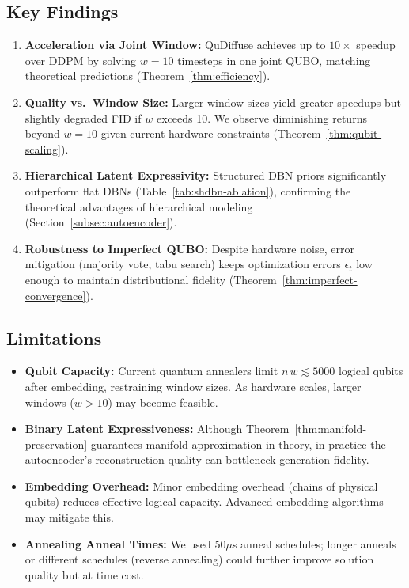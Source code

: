 \documentclass[11pt,letterpaper]{article}
\begin{document}
\subsection{Key Findings}
\begin{enumerate}[noitemsep,topsep=0pt]
    \item \textbf{Acceleration via Joint Window:} QuDiffuse achieves up to $10\times$ speedup over DDPM by solving $w=10$ timesteps in one joint QUBO, matching theoretical predictions (Theorem~\ref{thm:efficiency}).
    \item \textbf{Quality vs.\ Window Size:} Larger window sizes yield greater speedups but slightly degraded FID if $w$ exceeds 10. We observe diminishing returns beyond $w=10$ given current hardware constraints (Theorem~\ref{thm:qubit-scaling}).
    \item \textbf{Hierarchical Latent Expressivity:} Structured DBN priors significantly outperform flat DBNs (Table~\ref{tab:shdbn-ablation}), confirming the theoretical advantages of hierarchical modeling (Section~\ref{subsec:autoencoder}).
    \item \textbf{Robustness to Imperfect QUBO:} Despite hardware noise, error mitigation (majority vote, tabu search) keeps optimization errors $\epsilon_t$ low enough to maintain distributional fidelity (Theorem~\ref{thm:imperfect-convergence}).
\end{enumerate}

\subsection{Limitations}
\begin{itemize}[noitemsep,topsep=0pt]
    \item \textbf{Qubit Capacity:} Current quantum annealers limit $n\,w \lesssim 5000$ logical qubits after embedding, restraining window sizes. As hardware scales, larger windows ($w>10$) may become feasible.
    \item \textbf{Binary Latent Expressiveness:} Although Theorem~\ref{thm:manifold-preservation} guarantees manifold approximation in theory, in practice the autoencoder’s reconstruction quality can bottleneck generation fidelity.
    \item \textbf{Embedding Overhead:} Minor embedding overhead (chains of physical qubits) reduces effective logical capacity. Advanced embedding algorithms may mitigate this.
    \item \textbf{Annealing Anneal Times:} We used 50$\mu$s anneal schedules; longer anneals or different schedules (reverse annealing) could further improve solution quality but at time cost.
\end{itemize}
\end{document}
